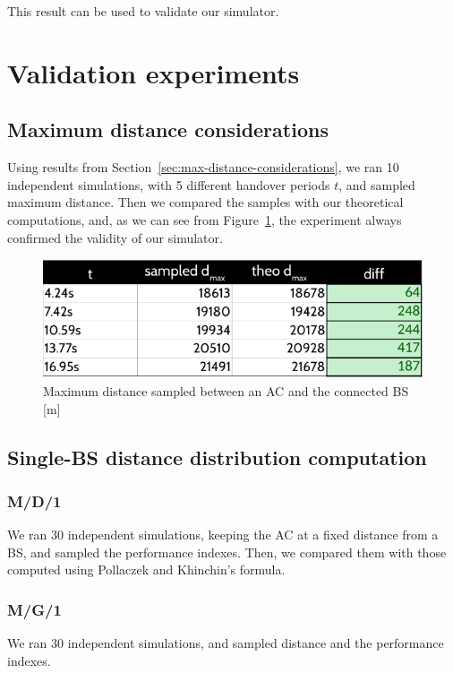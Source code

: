 \documentclass[a4paper,12pt]{article}
\begin{document}
This result can be used to validate our simulator.

\section{Validation experiments}
\subsection{Maximum distance considerations}
Using results from Section~\ref{sec:max-distance-considerations}, we ran 10 independent simulations, with 5 different handover periods $t$, and sampled maximum distance.
Then we compared the samples with our theoretical computations, and, as we can see from Figure~\ref{fig:dmax-validation}, the experiment always confirmed the validity of our simulator.
\begin{figure}[H]
  \centering
  \includegraphics[scale=0.8]{img/dmax-validation.pdf}
  \caption{Maximum distance sampled between an AC and the connected BS [m]}
  \label{fig:dmax-validation}
\end{figure}

\subsection{Single-BS distance distribution computation}
\subsubsection{M/D/1}
We ran 30 independent simulations, keeping the AC at a fixed distance from a BS, and sampled the performance indexes.
Then, we compared them with those computed using Pollaczek and Khinchin’s formula.

\subsubsection{M/G/1}
We ran 30 independent simulations, and sampled distance and the performance indexes.
\end{document}
